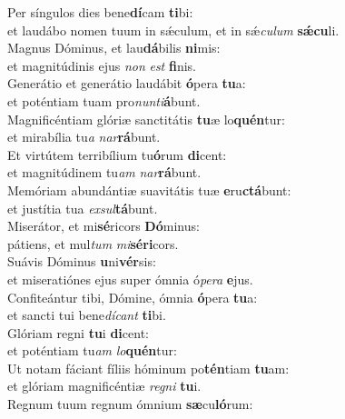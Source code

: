 \evenverse Per síngulos dies bene\textbf{dí}cam \textbf{ti}bi:~\*\\
\evenverse et laudábo nomen tuum in sǽculum, et in sǽ\textit{cu}\textit{lum} \textbf{sǽ}\textbf{cu}li.\\
\oddverse Magnus Dóminus, et lau\textbf{dá}bilis \textbf{ni}mis:~\*\\
\oddverse et magnitúdinis ejus \textit{non} \textit{est} \textbf{fi}nis.\\
\evenverse Generátio et generátio laudábit \textbf{ó}pera \textbf{tu}a:~\*\\
\evenverse et poténtiam tuam pro\textit{nun}\textit{ti}\textbf{á}bunt.\\
\oddverse Magnificéntiam glóriæ sanctitátis \textbf{tu}æ lo\textbf{quén}tur:~\*\\
\oddverse et mirabília tu\textit{a} \textit{nar}\textbf{rá}bunt.\\
\evenverse Et virtútem terribílium tu\textbf{ó}rum \textbf{di}cent:~\*\\
\evenverse et magnitúdinem tu\textit{am} \textit{nar}\textbf{rá}bunt.\\
\oddverse Memóriam abundántiæ suavitátis tuæ \textbf{e}ru\textbf{ctá}bunt:~\*\\
\oddverse et justítia tua \textit{ex}\textit{sul}\textbf{tá}bunt.\\
\evenverse Miserátor, et mi\textbf{sé}ricors \textbf{Dó}minus:~\*\\
\evenverse pátiens, et mul\textit{tum} \textit{mi}\textbf{sé}\textbf{ri}cors.\\
\oddverse Suávis Dóminus \textbf{u}ni\textbf{vér}sis:~\*\\
\oddverse et miseratiónes ejus super ómnia ó\textit{pe}\textit{ra} \textbf{e}jus.\\
\evenverse Confiteántur tibi, Dómine, ómnia \textbf{ó}pera \textbf{tu}a:~\*\\
\evenverse et sancti tui bene\textit{dí}\textit{cant} \textbf{ti}bi.\\
\oddverse Glóriam regni \textbf{tu}i \textbf{di}cent:~\*\\
\oddverse et poténtiam tu\textit{am} \textit{lo}\textbf{quén}tur:\\
\evenverse Ut notam fáciant fíliis hóminum po\textbf{tén}tiam \textbf{tu}am:~\*\\
\evenverse et glóriam magnificéntiæ \textit{re}\textit{gni} \textbf{tu}i.\\
\oddverse Regnum tuum regnum ómnium \textbf{sæ}cu\textbf{ló}rum:~\*\\
